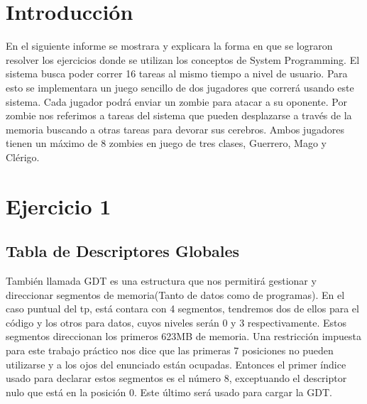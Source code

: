 \documentclass[a4paper]{article}
\begin{document}
\thispagestyle{empty}
\maketitle
\newpage


\thispagestyle{empty}
\vspace{3cm}
\tableofcontents
\newpage




\section{Introducción}

En el siguiente informe se mostrara y explicara la forma en que se lograron resolver los ejercicios donde se utilizan los conceptos de System Programming. El sistema busca poder correr 16 tareas al mismo tiempo a nivel de usuario. Para esto se implementara un juego sencillo de dos jugadores que correrá usando este sistema. Cada jugador podrá enviar un zombie para atacar a su oponente. Por zombie nos referimos a tareas del sistema que pueden desplazarse a través de la memoria buscando a otras tareas para devorar sus cerebros. 
Ambos jugadores tienen un máximo de 8 zombies en juego de tres clases, Guerrero, Mago y Clérigo. 

\section {Ejercicio 1}

\subsection{Tabla de Descriptores Globales}

También llamada GDT es una estructura que nos permitirá gestionar y direccionar segmentos de memoria(Tanto de datos como de programas). En el caso puntual del tp, está contara con 4 segmentos, tendremos dos de ellos para el código y los otros para datos, cuyos niveles serán 0 y 3 respectivamente. Estos segmentos direccionan los primeros 623MB de memoria. Una restricción impuesta para este trabajo práctico nos dice que las primeras 7 posiciones no pueden utilizarse y a los ojos del enunciado están ocupadas. Entonces el primer índice usado para declarar estos segmentos es el número 8, exceptuando el descriptor nulo que está en la posición 0. Este último será usado para cargar la GDT.
\end{document}
